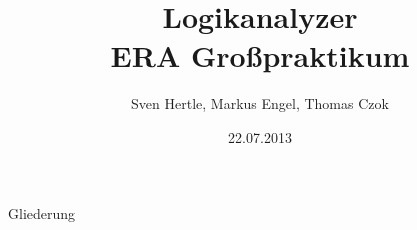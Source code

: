 

\title[GP Logikanalyzer]{Logikanalyzer\\\normalsize ERA Großpraktikum}
\author[]{Sven Hertle, Markus Engel, Thomas Czok}
\date{22.07.2013}


\begin{frame}{}
    \titlepage
\end{frame}

\begin{frame}{Gliederung}
    \tableofcontents
\end{frame}



\addtocounter{framenumber}{-1}
\frame[plain]{}


